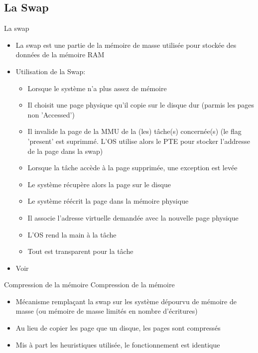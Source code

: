 \subsection{La Swap}

\begin{frame}{La swap}
  \begin{itemize}
  \item La  swap est une partie  de la mémoire de  masse utilisée pour
    stockée des données de la mémoire RAM
  \item Utilisation de la Swap:
    \begin{itemize}
    \item Lorsque le système n'a plus assez de mémoire
    \item Il choisit une page physique qu'il copie sur le disque dur (parmis les pages non 'Accessed')
    \item  Il  invalide  la  page  de  la MMU  de  la  (les)  tâche(s)
      concernée(s) (le flag 'present' est suprimmé. L'OS utilise alors le PTE pour stocker l'addresse de la page dans la swap)
    \item Lorsque la  tâche accède à la page  supprimée, une exception
      est levée
    \item Le système récupère alors la page sur le disque
    \item Le système réécrit la page dans la mémoire physique
    \item  Il associe  l'adresse virtuelle  demandée avec  la nouvelle
      page physique
    \item L'OS rend la main à la tâche
    \item Tout est transparent pour la tâche
    \end{itemize}
  \item Voir 
  \end{itemize}
\end{frame}

\begin{frame}[fragile=singleslide]{Compression de la mémoire}
  Compression de la mémoire
  \begin{itemize}
  \item  Mécanisme remplaçant  la  swap sur  les  système dépourvu  de
    mémoire  de   masse  (ou  mémoire  de  masse   limités  en  nombre
    d'écritures)
  \item  Au lieu  de copier  les page  que un  disque, les  pages sont
    compressés
  \item Mis  à part les  heuristiques utilisée, le  fonctionnement est
    identique
  \end{itemize}
\end{frame}

